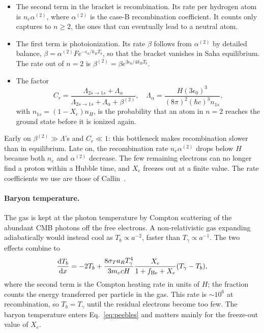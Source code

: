 \begin{itemize}
\item The second term in the bracket is recombination. Its rate per hydrogen atom is $n_e\alpha^{(2)}$, where
      $\alpha^{(2)}$ is the case-B recombination coefficient. It counts only captures to $n\ge2$, the ones that can
      eventually lead to a neutral atom.
\item The first term is photoionization. Its rate $\beta$ follows from $\alpha^{(2)}$ by detailed balance,
      $\beta=\alpha^{(2)}Fe^{-\epsilon_0/k_BT_b}$, so that the bracket vanishes in Saha equilibrium. The rate out of
      $n=2$ is $\beta^{(2)}=\beta e^{3\epsilon_0/4k_BT_b}$.
\item The factor
\begin{equation}
C_r = \frac{\Lambda_{2s\to1s}+\Lambda_\alpha}{\Lambda_{2s\to1s}+\Lambda_\alpha+\beta^{(2)}},\quad
\Lambda_\alpha = \frac{H(3\epsilon_0)^3}{(8\pi)^2(\hbar c)^3 n_{1s}},
\end{equation}
      with $n_{1s}=(1-X_e)n_H$, is the probability that an atom in $n=2$ reaches the ground state before it is ionized
      again.
\end{itemize}
Early on $\beta^{(2)}\gg\Lambda$'s and $C_r\ll1$: this bottleneck makes recombination slower than in equilibrium. Late
on, the recombination rate $n_e\alpha^{(2)}$ drops below $H$ because both $n_e$ and $\alpha^{(2)}$ decrease. The few
remaining electrons can no longer find a proton within a Hubble time, and $X_e$ freezes out at a finite value. The rate
coefficients we use are those of Callin~\cite{Callin2006}.

\paragraph*{Baryon temperature.} The gas is kept at the photon temperature by Compton scattering of the abundant CMB
photons off the free electrons. A non-relativistic gas expanding adiabatically would instead cool as
$T_b\propto a^{-2}$, faster than $T_\gamma\propto a^{-1}$. The two effects combine to
\begin{equation}
\frac{\mathrm{d} T_b}{\mathrm{d} x} = -2T_b + \frac{8\sigma_Ta_RT_\gamma^4}{3m_ecH}\frac{X_e}{1+f_{\rm He}+X_e}(T_\gamma-T_b),
\end{equation}
where the second term is the Compton heating rate in units of $H$; the fraction counts the energy transferred per
particle in the gas. This rate is $\sim10^6$ at recombination, so $T_b=T_\gamma$ until the residual electrons become too
few. The baryon temperature enters Eq.~\eqref{eq:peebles} and matters mainly for the freeze-out value of $X_e$.

